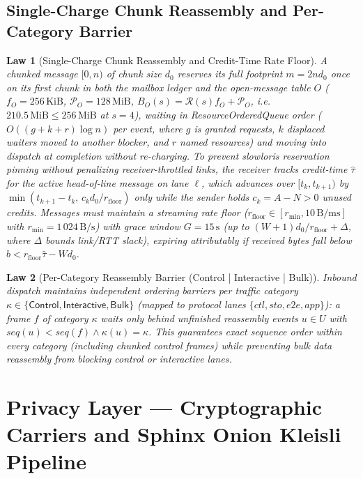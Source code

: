 \documentclass[journal]{IEEEtran}
\newtheorem{law}{Law}
\DeclareRobustCommand{\code}[1]{{\ttfamily\renewcommand{\_}{\textunderscore\allowbreak}#1}}
\begin{document}
\subsection{Single-Charge Chunk Reassembly and Per-Category Barrier}

\begin{law}[Single-Charge Chunk Reassembly and Credit-Time Rate Floor]\label{law:chunk-reassembly}
A chunked message $[0,n)$ of chunk size $d_0$ reserves its full footprint
$m=2n d_0$ \emph{once} on its first chunk in both the mailbox ledger and the open-message
table $O$ ($f_O=256\,\mathrm{KiB}$, $\mathcal{P}_O=128\,\mathrm{MiB}$,
$B_O(s)=\mathcal{R}(s)f_O+\mathcal{P}_O$, i.e.\ $210.5\,\mathrm{MiB}\le 256\,\mathrm{MiB}$ at $s=4$), waiting in \code{ResourceOrderedQueue}
order ($O((g+k+r)\log n)$ per event, where $g$ is granted requests, $k$ displaced waiters moved to another blocker, and $r$ named resources) and moving into dispatch at completion
without re-charging.  To prevent slowloris reservation pinning without penalizing
receiver-throttled links, the receiver tracks \emph{credit-time} $\hat{\tau}$ for the active
head-of-line message on lane $\ell$,
which advances over $[t_k,t_{k+1})$ by $\min(t_{k+1}-t_k,\,c_k d_0/r_{\mathrm{floor}})$ only
while the sender holds $c_k=A-N>0$ unused credits.  Messages must maintain a
streaming rate floor ($r_{\mathrm{floor}}\in[r_{\min},10\,\mathrm{B/ms}]$ with $r_{\min}=1\,024\,\mathrm{B/s}$)
with grace window $G=15\,\mathrm{s}$ (up to $(W+1)d_0/r_{\mathrm{floor}}+\Delta$, where $\Delta$ bounds link/RTT slack), expiring
attributably if received bytes fall below $b<r_{\mathrm{floor}}\hat{\tau}-W d_0$.
\end{law}

\begin{law}[Per-Category Reassembly Barrier (\code{Control | Interactive | Bulk})]\label{law:category-barrier}
Inbound dispatch maintains independent ordering barriers per traffic category
$\kappa\in\{\mathsf{Control},\mathsf{Interactive},\mathsf{Bulk}\}$ (mapped to
protocol lanes $\{\mathit{ctl},\mathit{sto},\mathit{e2e},\mathit{app}\}$): a
frame $f$ of category $\kappa$ waits only behind unfinished reassembly events
$u\in U$ with $\mathit{seq}(u)<\mathit{seq}(f)\land\kappa(u)=\kappa$.  This
guarantees exact sequence order within every category (including chunked control
frames) while preventing bulk data reassembly from blocking control or
interactive lanes.
\end{law}

\section{Privacy Layer --- Cryptographic Carriers and Sphinx Onion Kleisli Pipeline}\label{sec:privacy}
\end{document}
